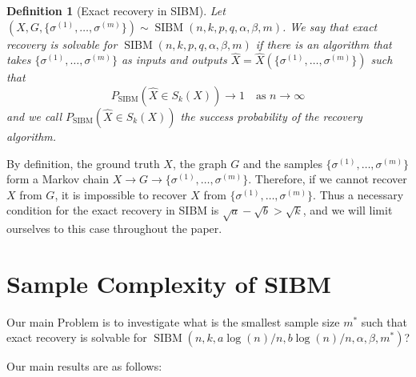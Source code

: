 \documentclass[conference]{IEEEtran}
\newtheorem{definition}{Definition}%
\DeclareMathOperator{\SIBM}{SIBM}
\begin{document}
	
	\begin{definition}[Exact recovery in SIBM]
		Let $(X,G,\{\sigma^{(1)},\dots,\sigma^{(m)}\}) \sim \SIBM(n,k,p,q,\alpha,\beta,m)$.
		We say that exact recovery is solvable for $\SIBM(n,k,p,q,\alpha,\beta,m)$ if there is an algorithm that takes $\{\sigma^{(1)},\dots,\sigma^{(m)}\}$ as inputs and outputs $\hat{X}=\hat{X}(\{\sigma^{(1)},\dots,\sigma^{(m)}\})$ such that
		$$
		P_{\SIBM}(\hat{X} \in S_k(X)) \to 1
		\text{~~~as~} n\to\infty
		$$
		and we call $P_{\SIBM}(\hat{X} \in S_k(X))$ the success probability of the recovery algorithm.
	\end{definition}
	
	By definition, the ground truth $X$, the graph $G$ and the samples $\{\sigma^{(1)},\dots,\sigma^{(m)}\}$ form a Markov chain $X\to G\to \{\sigma^{(1)},\dots,\sigma^{(m)}\}$. Therefore, if we cannot recover $X$ from $G$, it is impossible to recover $X$ from $\{\sigma^{(1)},\dots,\sigma^{(m)}\}$. Thus a necessary condition for the exact recovery in SIBM is $\sqrt{a}-\sqrt{b}> \sqrt{k}$, and we will limit ourselves to this case throughout the paper.
	
	\section{Sample Complexity of SIBM}\label{s:trans}
	Our main Problem is to investigate what is the smallest sample size $m^\ast$ such that exact recovery is solvable for $\SIBM(n,k, a\log(n)/n, b\log(n)/n,\alpha,\beta,m^\ast)$?
	
	Our main results are as follows:
	
\end{document}
